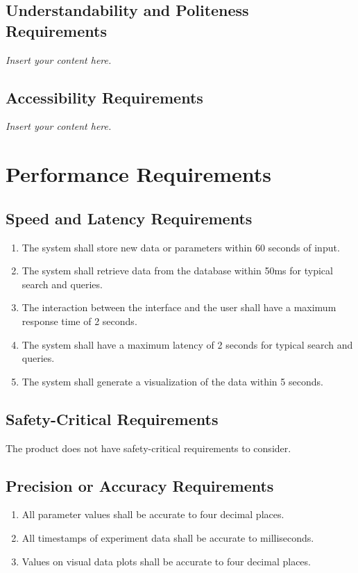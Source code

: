 \documentclass[12pt]{article}
\newcommand{\lips}{\textit{Insert your content here.}}
\begin{document}
\subsection{Understandability and Politeness Requirements}
\lips
\subsection{Accessibility Requirements}
\lips

\section{Performance Requirements}
\subsection{Speed and Latency Requirements}
\begin{enumerate}
\item The system shall store new data or parameters within 60 seconds of input.
\item The system shall retrieve data from the database within 50ms for typical search and queries.
\item The interaction between the interface and the user shall have a maximum response time of 2 seconds.
\item The system shall have a maximum latency of 2 seconds for typical search and queries.
\item The system shall generate a visualization of the data within 5 seconds.
\end{enumerate}

\subsection{Safety-Critical Requirements}
The product does not have safety-critical requirements to consider.

\subsection{Precision or Accuracy Requirements}
\begin{enumerate}
  \item All parameter values shall be accurate to four decimal places.
  \item All timestamps of experiment data shall be accurate to milliseconds. 
  \item Values on visual data plots shall be accurate to four decimal places.
\end{enumerate}
\end{document}
